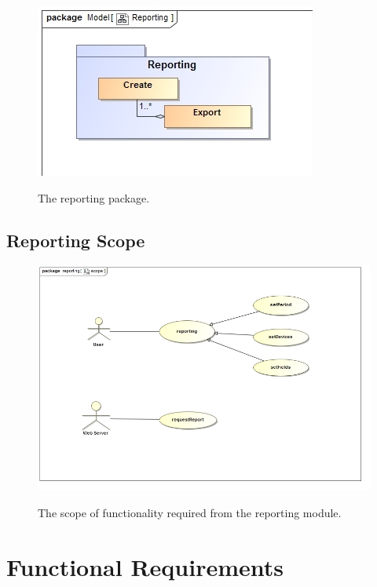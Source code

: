 \documentclass[paper=a4, fontsize=11pt]{scrartcl} %
\begin{document}
	\begin{figure}[H]
		\includegraphics[width=\textwidth]{images/Reporting.jpg}  \\
		\caption{The reporting package.}
	\end{figure}

	
	\subsection{Reporting Scope}
	\begin{figure}[H]
		\includegraphics[width=\textwidth]{images/reportingScope.jpg}  \\
		\caption{The scope of functionality required from the reporting module.}
	\end{figure}
	\newpage
	\section{Functional Requirements}
	\newpage
\end{document}
